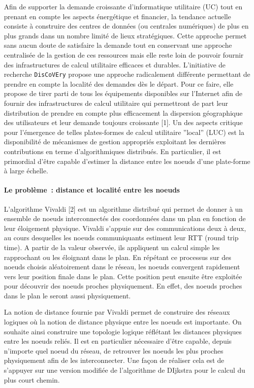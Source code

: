 \documentclass[a4paper,11pt]{article}
\newcommand{\discovery}{\texttt{DisCoVEry}\xspace}
\begin{document}
\begin{note}
 Afin de supporter la demande croissante d'informatique utilitaire (UC) tout en prenant en compte les aspects énergétique et financier, la tendance actuelle consiste à construire des centres de données (ou centrales numériques) de plus en plus grands dans un nombre limité de lieux stratégiques. Cette approche permet sans aucun doute de satisfaire la demande tout en conservant une approche centralisée de la gestion de ces ressources mais elle reste loin de pouvoir fournir des infrastructures de calcul utilitaire efficaces et durables.
   L'initiative de recherche \discovery propose une approche radicalement différente permettant de prendre en compte la localité des demandes dès le départ.
Pour ce faire, elle propose de tirer parti de tous les équipements
disponibles sur l'Internet afin de fournir des infrastructures de calcul
utilitaire  qui permettront de part leur distribution de prendre en compte plus
efficacement la dispersion géographique des utilisateurs et leur demande
toujours croissante [1]. Un des aspects critique pour l'émergence de telles
plates-formes de calcul utilitaire ''local'' (LUC) est la disponibilité de
mécanismes de gestion appropriés exploitant les dernières contributions en terme d'algorithmiques distribués. 
En particulier, il est primordial d'être capable d'estimer la distance entre les noeuds d'une plate-forme à large échelle.

\paragraph*{Le problème~:  distance et localité entre les noeuds\\}

L'algorithme Vivaldi [2] est un algorithme distribué qui permet de donner à un
ensemble de noeuds interconnectés des coordonnées dans un plan en fonction de
leur éloigement physique. Vivaldi s'appuie sur des communications deux à deux,
au cours desquelles les noeuds communiquants estiment leur RTT (round trip
time). A partir de la valeur observée, ils appliquent un calcul simple les
rapprochant ou les éloignant dans le plan. En répétant ce processus sur des
noeuds choisis aléatoirement dans le réseau, les noeuds convergent rapidement
vers leur position finale dans le plan. Cette position peut ensuite être
exploitée pour découvrir des noeuds proches physiquement. En effet, des noeuds
proches dans le plan le seront aussi physiquement.

La notion de distance fournie par Vivaldi permet de construire des réseaux
logiques où la notion de distance physique entre les noeuds est importante. On
souhaite ainsi construire une topologie logique réflétant les distances
physiques entre les noeuds reliés. Il est en particulier nécessaire d'être
capable, depuis n'importe quel noeud du réseau, de retrouver les noeuds les
plus proches physiquement afin de les interconnecter. Une façon de réaliser
cela est de s'appuyer sur une version modifiée de l'algorithme de DIjkstra pour
le calcul du plus court chemin.


\end{note}
\end{document}
